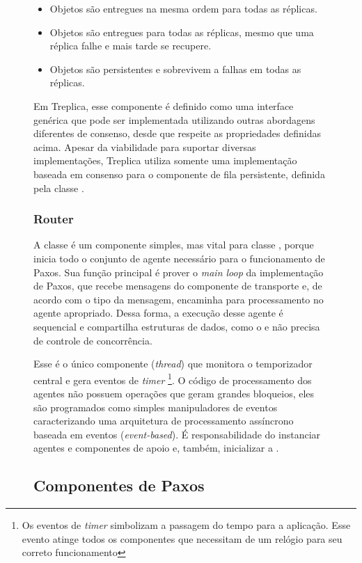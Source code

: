 \begin{figure}[ht]
\begin{itemize}
  \item Objetos são entregues na mesma ordem para todas as réplicas.
  \item Objetos são entregues para todas as réplicas, mesmo que uma réplica falhe e mais
    tarde se recupere.
  \item Objetos são persistentes e sobrevivem a falhas em todas as réplicas.
\end{itemize}

Em Treplica, esse componente é definido como uma interface genérica que pode ser
implementada utilizando outras abordagens diferentes de consenso, desde que respeite as
propriedades definidas acima. Apesar da viabilidade para suportar diversas implementações,
Treplica utiliza somente uma implementação baseada em consenso para o componente de fila
persistente, definida pela classe .

\subsubsection{Router}

A classe  é um componente simples, mas vital para classe
, porque inicia todo o conjunto de agente necessário para
o funcionamento de Paxos. Sua função principal é prover o \emph{main loop} da
implementação de Paxos, que recebe mensagens do componente de transporte e, de acordo com
o tipo da mensagem, encaminha para processamento no agente apropriado. Dessa forma, a
execução desse agente é sequencial e compartilha estruturas de dados, como o
 e não precisa de controle de concorrência.

Esse é o único componente (\emph{thread}) que monitora o temporizador central e gera
eventos de \emph{timer} \footnote{Os eventos de \emph{timer} simbolizam a passagem do
tempo para a aplicação. Esse evento atinge todos os componentes que necessitam de um
relógio para seu correto funcionamento}. O código de processamento dos agentes não possuem
operações que geram grandes bloqueios, eles são programados como simples manipuladores de
eventos caracterizando uma arquitetura de processamento assíncrono baseada em eventos
(\emph{event-based}). É responsabilidade do  instanciar agentes e
componentes de apoio e, também, inicializar a .

\subsection{Componentes de Paxos}


\end{figure}
